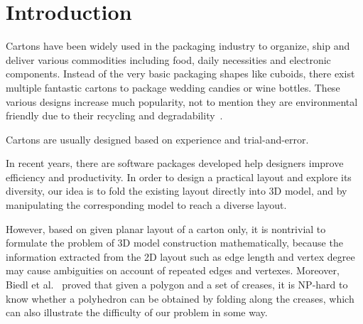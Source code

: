 \section{Introduction}

Cartons have been widely used in the packaging industry to organize, ship and deliver various commodities including food, daily necessities and electronic components. Instead of the very basic packaging shapes like cuboids, there exist multiple fantastic cartons to package wedding candies or wine bottles. 
These various designs increase much popularity, not to mention they are environmental friendly due to their recycling and degradability~\cite{Mullineux:2010:CSC:1739328.1739673}.

Cartons are usually designed based on experience and trial-and-error.

In recent years, there are software packages developed help designers improve efficiency and productivity.
In order to design a practical layout and explore its diversity, our idea is to fold the existing layout directly into 3D model, and by manipulating the corresponding model to reach a diverse layout.

However, based on given planar layout of a carton only, it is nontrivial to formulate the problem of 3D model construction mathematically, because the information extracted from the 2D layout such as edge length and vertex degree may cause ambiguities on account of repeated edges and vertexes. Moreover, Biedl et al.~\cite{Biedl:2005:NFP:1090462.1646553} proved that given a polygon and a set of creases, it is NP-hard to know whether a polyhedron can be obtained by folding along the creases, which can also illustrate the difficulty of our problem in some way.

